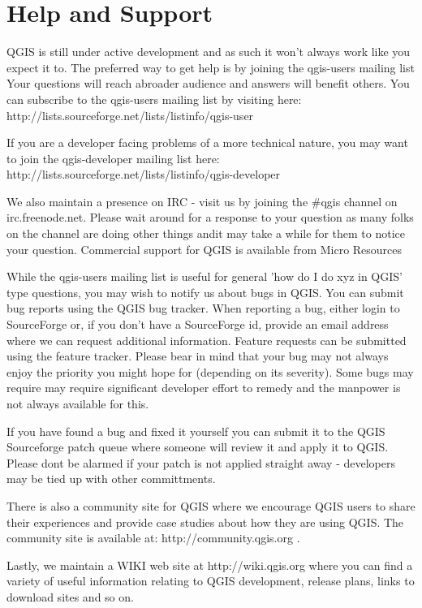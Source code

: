 \section{Help and Support}

QGIS is still under active development and as such it won't always work like you expect it to.
The preferred way to get help is by joining the qgis-users mailing list Your questions will reach abroader audience and answers will benefit others. You can subscribe to the qgis-users mailing list by visiting here: http://lists.sourceforge.net/lists/listinfo/qgis-user

If you are a developer facing problems of a more technical nature, you may want to join the qgis-developer mailing list here: http://lists.sourceforge.net/lists/listinfo/qgis-developer

We also maintain a presence on IRC - visit us by joining the \#qgis channel on irc.freenode.net. Please wait around for a response to your question as many folks on the channel are doing other things andit may take a while for them to notice your question.
Commercial support for QGIS is available from Micro Resources 

While the qgis-users mailing list is useful for general 'how do I do xyz in QGIS' type questions, you may wish to notify us about bugs in QGIS. You can submit bug reports using the QGIS bug tracker. When reporting a bug, either login to SourceForge or, if you don't have a SourceForge id, provide an email address where we can request additional information.
Feature requests can be submitted using the feature tracker. Please bear in mind that your bug may not always enjoy the priority you might hope for (depending on its severity). Some bugs may require may require significant developer effort to remedy and the manpower is not always available for this.

If you have found a bug and fixed it yourself you can submit it to the QGIS Sourceforge patch queue where someone will review it and apply it to QGIS. Please dont be alarmed if your patch is not applied straight away - developers may be tied up with other committments.

There is also a community site for QGIS where we encourage QGIS users to share their experiences and provide case studies about how they are using QGIS. The community site is available at: http://community.qgis.org .

Lastly, we maintain a WIKI web site at http://wiki.qgis.org where you can find a variety of useful information relating to QGIS development, release plans, links to download sites and so on.